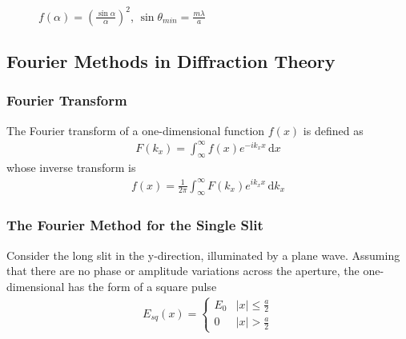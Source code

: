 \begin{figure}[H]
    \centering
    \caption{$f(\alpha)=\left(\frac{\sin\alpha}{\alpha}\right)^2$, $\sin\theta_{min}=\frac{m\lambda}{a}$}
\end{figure}


\subsection{Fourier Methods in Diffraction Theory}

\subsubsection{Fourier Transform}
The Fourier transform of a one-dimensional function $f(x)$ is defined as 
\begin{align*}
    F(k_x)=\int_{\infty}^{\infty} f(x)e^{-ik_x x}\,\mathrm{d}x
\end{align*}
whose inverse transform is 
\begin{align*}
    f(x)=\frac{1}{2\pi}\int_{\infty}^{\infty}F(k_x)e^{ik_x x}\,\mathrm{d}k_x
\end{align*}

\subsubsection{The Fourier Method for the Single Slit}
Consider the long slit in the y-direction, illuminated by a plane wave. Assuming that there are no phase or amplitude variations across the aperture, the one-dimensional  has the form of a square pulse
\begin{align*}
    E_{sq}(x)=\left\{
        \begin{array}{cc}
            E_0 & |x|\le \frac{a}{2}\\
            0 & |x|>\frac{a}{2}
        \end{array}
    \right.
\end{align*}

